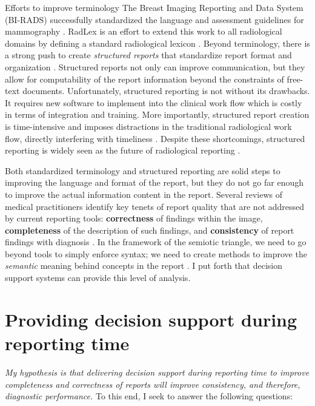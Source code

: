 Efforts to improve terminology 
The Breast Imaging Reporting and Data System (BI-RADS) successfully standardized the language and assessment guidelines for mammography \cite{Liberman:ws,Langlotz:2009fn,Burnside:2009ki}.
RadLex is an effort to extend this work to all radiological domains by defining a standard radiological lexicon \cite{Langlotz:2006jn}.
Beyond terminology, there is a strong push to create \emph{structured reports} that standardize report format and organization \cite{Langlotz:2009dd,Reiner:2009ib}.
Structured reports not only can improve communication, but they allow for computability of the report information beyond the constraints of free-text documents.
Unfortunately, structured reporting is not without its drawbacks.
It requires new software to implement into the clinical work flow which is costly in terms of integration and training.
More importantly, structured report creation is time-intensive and imposes distractions in the traditional radiological work flow, directly interfering with timeliness \cite{Weiss:2008er}.
Despite these shortcomings, structured reporting is widely seen as the future of radiological reporting \cite{Langlotz:2015vq}.

Both standardized terminology and structured reporting are solid steps to improving the language and format of the report, but they do not go far enough to improve the actual information content in the report.
Several reviews of medical practitioners identify key tenets of report quality that are not addressed by current reporting tools: \textbf{correctness} of findings within the image, \textbf{completeness} of the description of such findings, and \textbf{consistency} of report findings with diagnosis \cite{Johnson:2004kh, HaraldO:2004hi, Reiner:2006fa}.
In the framework of the semiotic triangle, we need to go beyond tools to simply enforce syntax; we need to create methods to improve the \emph{semantic} meaning behind concepts in the report \cite{Mead:2006wm}.
I put forth that decision support systems can provide this level of analysis. 


\section{Providing decision support during reporting time}

\emph{My hypothesis is that delivering decision support during reporting time to improve completeness and correctness of reports will improve consistency, and therefore, diagnostic performance.} To this end, I seek to answer the following questions:

